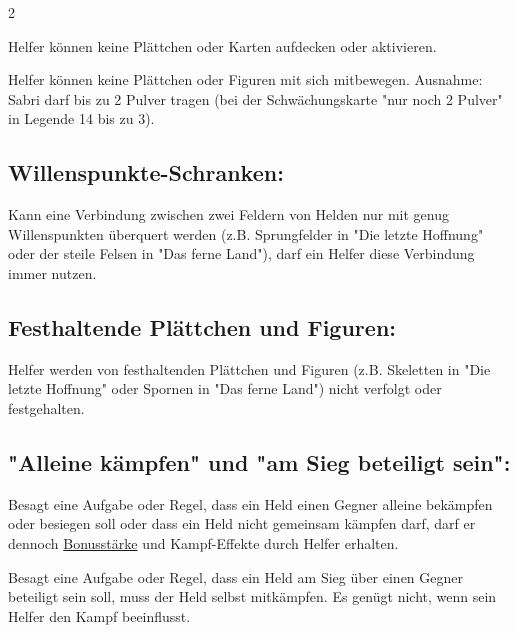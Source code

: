 \documentclass[10pt, a4paper, oneside]{book}
\begin{document}
\begin{multicols*}{2}
\begin{nobgcolor}
Helfer können keine Plättchen oder Karten aufdecken oder aktivieren.
\supercite{NH:Begleitheft,DlH17:Hoffnungskarte_Zwerg,DH:Begleitheft,MH:Begleitheft}

Helfer können keine Plättchen oder Figuren mit sich mitbewegen.
\supercite{NH:Begleitheft,DlH17:Hoffnungskarte_Zwerg,DH:Begleitheft,MH:Begleitheft}
Ausnahme: Sabri darf bis zu 2 Pulver tragen (bei der Schwächungskarte "nur noch 2 Pulver" in Legende 14 bis zu 3).






\subsection{Willenspunkte-Schranken:}

Kann eine Verbindung zwischen zwei Feldern von Helden nur mit genug Willenspunkten überquert werden (z.B. Sprungfelder in "Die letzte Hoffnung" oder der steile Felsen in "Das ferne Land"), darf ein Helfer diese Verbindung immer nutzen.
\supercite{DlH17:Hoffnungskarte_Zwerg,DH:Begleitheft,94521}


\subsection{Festhaltende Plättchen und Figuren:}

Helfer werden von festhaltenden Plättchen und Figuren (z.B. Skeletten in "Die letzte Hoffnung" oder Spornen in "Das ferne Land") nicht verfolgt oder festgehalten.\supercite{DlH17:Hoffnungskarte_Zwerg,AG:Begleitheft,MH:Begleitheft}



\columnbreak

\subsection{"Alleine kämpfen" und "am Sieg beteiligt sein":}


Besagt eine Aufgabe oder Regel, dass ein Held einen Gegner alleine bekämpfen oder besiegen soll oder dass ein Held nicht gemeinsam kämpfen darf, darf er dennoch \hyperref[Bonusstärke]{Bonusstärke} und Kampf-Effekte durch Helfer erhalten.
\supercite{StSch:Varkurs_Triumph,5623,17369}

Besagt eine Aufgabe oder Regel, dass ein Held am Sieg über einen Gegner beteiligt sein soll, muss der Held selbst mitkämpfen. Es genügt nicht, wenn sein Helfer den Kampf beeinflusst.
\supercite{28472}










\end{nobgcolor}
\end{multicols*}
\end{document}
